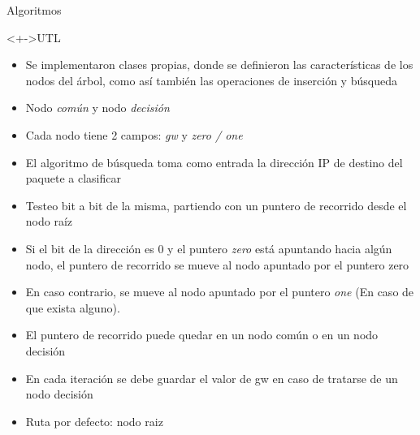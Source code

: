 \documentclass[xcolor=dvipsnames]{beamer}
\begin{document}
\begin{frame}{Algoritmos}
\begin{block}<+->{UTL}   
    \begin{itemize}
      \scriptsize
     	
     	\item Se implementaron clases propias, donde se definieron las características de los nodos del árbol, como así también las operaciones de inserción y búsqueda
     	\item Nodo \emph{común} y nodo \emph{decisión}
	\item Cada nodo tiene 2 campos: \emph{gw} y \emph{zero / one}
	\item El algoritmo de búsqueda toma como entrada la dirección IP de destino del paquete a clasificar
	\item Testeo bit a bit de la misma, partiendo con un puntero de recorrido desde el nodo raíz
	\item Si el bit de la dirección es 0 y el puntero \emph{zero} está apuntando hacia algún nodo, el puntero de recorrido se mueve al nodo apuntado por el puntero zero
	\item En caso contrario, se mueve al nodo apuntado por el puntero \emph{one} (En caso de que exista alguno).
	\item El puntero de recorrido puede quedar en un nodo común o en un nodo decisión
	\item En cada iteración se debe guardar el valor de gw en caso de tratarse de un nodo decisión
	\item Ruta por defecto: nodo raiz
    \end{itemize}
  \end{block}
\end{frame}
\end{document}
